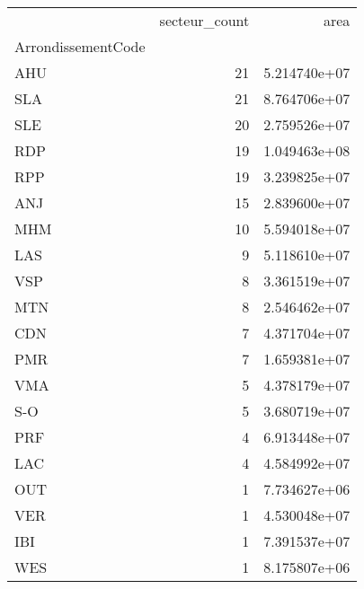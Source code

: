 \begin{tabular}{lrr}
\toprule
{} &  secteur\_count &          area \\
ArrondissementCode &                &               \\
\midrule
AHU                &             21 &  5.214740e+07 \\
SLA                &             21 &  8.764706e+07 \\
SLE                &             20 &  2.759526e+07 \\
RDP                &             19 &  1.049463e+08 \\
RPP                &             19 &  3.239825e+07 \\
ANJ                &             15 &  2.839600e+07 \\
MHM                &             10 &  5.594018e+07 \\
LAS                &              9 &  5.118610e+07 \\
VSP                &              8 &  3.361519e+07 \\
MTN                &              8 &  2.546462e+07 \\
CDN                &              7 &  4.371704e+07 \\
PMR                &              7 &  1.659381e+07 \\
VMA                &              5 &  4.378179e+07 \\
S-O                &              5 &  3.680719e+07 \\
PRF                &              4 &  6.913448e+07 \\
LAC                &              4 &  4.584992e+07 \\
OUT                &              1 &  7.734627e+06 \\
VER                &              1 &  4.530048e+07 \\
IBI                &              1 &  7.391537e+07 \\
WES                &              1 &  8.175807e+06 \\
\bottomrule
\end{tabular}
